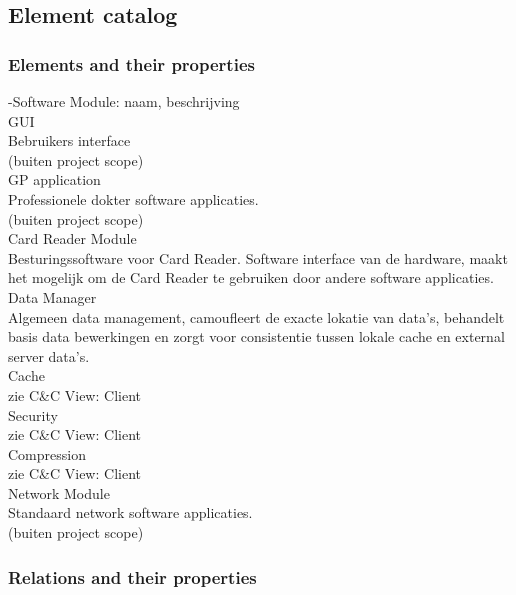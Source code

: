 \documentclass[a4paper,10pt]{article}
\begin{document}
\subsection{Element catalog}

\subsubsection{Elements and their properties}

-Software Module: naam, beschrijving\\

GUI\\
Bebruikers interface\\
(buiten project scope)\\

GP application\\
Professionele dokter software applicaties.\\
(buiten project scope)\\

Card Reader Module\\
Besturingssoftware voor Card Reader. Software interface van de hardware, maakt het mogelijk om de Card Reader te gebruiken door andere software applicaties.\\

Data Manager\\
Algemeen data management, camoufleert de exacte lokatie van data's, behandelt basis data bewerkingen en zorgt voor consistentie tussen lokale cache en external server data's.\\

Cache\\
zie C\&C View: Client\\

Security\\
zie C\&C View: Client\\

Compression\\
zie C\&C View: Client\\

Network Module\\
Standaard network software applicaties.\\
(buiten project scope)\\


\subsubsection{Relations and their properties}
\end{document}
